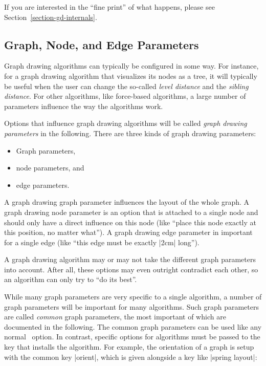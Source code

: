 {If you are interested in the ``fine print'' of what happens, please
see Section~\ref{section-gd-internals}.



\subsection{Graph, Node, and Edge Parameters}

Graph drawing algorithms can typically be configured in some way. For
instance, for a graph drawing algorithm that visualizes its nodes as a
tree, it will typically be useful when the user can change the
so-called \emph{level distance} and the \emph{sibling distance}. For
other algorithms, like force-based algorithms, a large number of
parameters influence the way the algorithms work.

Options that influence graph drawing algorithms will be called
\emph{graph drawing parameters} in the following. There are three kinds of
graph drawing parameters:
\begin{itemize}
\item Graph parameters,
\item node parameters, and
\item edge parameters.
\end{itemize}
A graph drawing graph parameter influences the layout of the whole
graph. A graph drawing node parameter is an option that is attached to
a single node and should only have a direct influence on this node
(like ``place this node exactly at this position, no matter what''). A
graph drawing edge parameter in important for a single edge (like
``this edge must be exactly |2cm| long'').

A graph drawing algorithm may or may not take the different graph
parameters into account. After all, these options may even outright
contradict each other, so an algorithm can only try to ``do its
best''.

While many graph parameters are very specific to a single algorithm, a
number of graph parameters will be important for many algorithms. Such
graph parameters are called \emph{common} graph parameters, the most
important of which are documented in the following. The common graph
parameters can be used like any normal \tikzname\ option. In contrast,
specific options for algorithms must be passed to the key that
installs the algorithm. For example, the orientation of a graph
is setup with the common key |orient|, which is given alongside a key
like |spring layout|:

}
